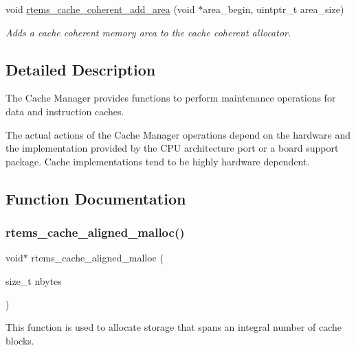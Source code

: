 \begin{DoxyCompactItemize}
void \mbox{\hyperlink{group__ClassicCache_ga49e156faa000460678269e06e183e087}{rtems\+\_\+cache\+\_\+coherent\+\_\+add\+\_\+area}} (void $\ast$area\+\_\+begin, uintptr\+\_\+t area\+\_\+size)
\begin{DoxyCompactList}\small\item\em Adds a cache coherent memory area to the cache coherent allocator. \end{DoxyCompactList}\end{DoxyCompactItemize}


\subsection{Detailed Description}
The Cache Manager provides functions to perform maintenance operations for data and instruction caches. 

The actual actions of the Cache Manager operations depend on the hardware and the implementation provided by the C\+PU architecture port or a board support package. Cache implementations tend to be highly hardware dependent. 

\subsection{Function Documentation}
\mbox{\label{group__ClassicCache_ga29c16023024c824dbf76a11539c921d1}} 
\subsubsection{\texorpdfstring{rtems\_cache\_aligned\_malloc()}{rtems\_cache\_aligned\_malloc()}}
{\footnotesize\ttfamily void$\ast$ rtems\+\_\+cache\+\_\+aligned\+\_\+malloc (\begin{DoxyParamCaption}\item[{size\+\_\+t}]{nbytes }\end{DoxyParamCaption})}

This function is used to allocate storage that spans an integral number of cache blocks. \mbox{\label{group__ClassicCache_ga49e156faa000460678269e06e183e087}} 
